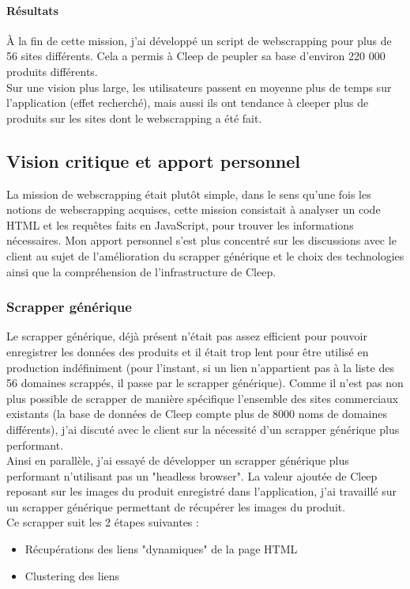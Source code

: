 \documentclass{article} %
\begin{document}
\paragraph{Résultats\\}
À la fin de cette mission, j'ai développé un script de webscrapping pour plus de 56 sites différents. Cela a permis à Cleep de peupler sa base d'environ 220 000 produits différents.\\
Sur une vision plus large, les utilisateurs passent en moyenne plus de temps sur l'application (effet recherché), mais aussi ils ont tendance à cleeper plus de produits sur les sites dont le webscrapping a été fait.

\subsection{Vision critique et apport personnel}

La mission de webscrapping était plutôt simple, dans le sens qu'une fois les notions de webscrapping acquises, cette mission consistait à analyser un code HTML et les requêtes faits en JavaScript, pour trouver les informations nécessaires. Mon apport personnel s'est plus concentré sur les discussions avec le client au sujet de l'amélioration du scrapper générique et le choix des technologies ainsi que la compréhension de l'infrastructure de Cleep.

\subsubsection{Scrapper générique\\}
Le scrapper générique, déjà présent n'était pas assez efficient pour pouvoir enregistrer les données des produits et il était trop lent pour être utilisé en production indéfiniment (pour l'instant, si un lien n'appartient pas à la liste des 56 domaines scrappés, il passe par le scrapper générique). Comme il n'est pas non plus possible de scrapper de manière spécifique l'ensemble des sites commerciaux existants (la base de données de Cleep compte plus de 8000 noms de domaines différents), j'ai discuté avec le client sur la nécessité d'un scrapper générique plus performant.\\
Ainsi en parallèle, j'ai essayé de développer un scrapper générique plus performant n'utilisant pas un "headless browser". La valeur ajoutée de Cleep reposant sur les images du produit enregistré dans l'application, j'ai travaillé sur un scrapper générique permettant de récupérer les images du produit.\\
Ce scrapper suit les 2 étapes suivantes :
\begin{itemize}
 \itemsep 0em
 \item Récupérations des liens "dynamiques" de la page HTML
 \item Clustering des liens
\end{itemize}
\end{document}
